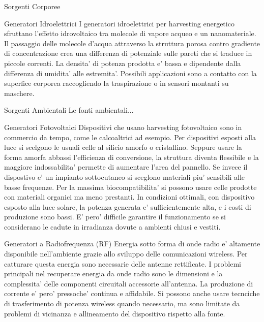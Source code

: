 \begin{section}{Sorgenti Corporee}
   \begin{subsection}{Generatori Idroelettrici}
    I generatori idroelettrici per harvesting energetico sfruttano l'effetto idrovoltaico tra molecole di vapore acqueo e un nanomateriale. Il passaggio delle molecole d'acqua attraverso la struttura porosa contro gradiente di concentrazione crea una differenza di potenziale sulle pareti che si traduce in piccole correnti. La densita' di potenza prodotta e' bassa e dipendente dalla differenza di umidita' alle estremita'. Possibili applicazioni sono a contatto con la superfice corporea raccogliendo la traspirazione o in sensori montanti su maschere. 
   \end{subsection}
\end{section}


\begin{section}{Sorgenti Ambientali}
    Le fonti ambientali...
    \begin{subsection}{Generatori Fotovoltaici}
    Dispositivi che usano harvesting fotovoltaico sono in commercio da tempo, come le calcoaltrici ad esempio. Per dispositivi esposti alla luce si scelgono le usuali celle al silicio amorfo o cristallino. Seppure usare la forma amorfa abbassi l'efficienza di conversione, la struttura diventa flessibile e la maggiore indossabilita' permette di aumentare l'area del pannello. Se invece il dispostivo e' un impianto sottocutaneo si sceglono materiali piu' sensibili alle basse frequenze. Per la massima biocompatibilita' si possono usare celle prodotte con materiali organici ma meno prestanti. In condizioni ottimali, con dispositivo esposto alla luce solare, la potenza generata e' sufficientemente alta, e i costi di produzione sono bassi. E' pero' difficile garantire il funzionamento se si considerano le cadute in irradianza dovute a ambienti chiusi e vestiti.
    \end{subsection}

    \begin{subsection}{Generatori a Radiofrequenza (RF)}
    Energia sotto forma di onde radio e' altamente disponibile nell'ambiente grazie allo sviluppo delle comunicazioni wireless. Per catturare questa energia sono necessarie delle antenne rettificate. I problemi principali nel recuperare energia da onde radio sono le dimensioni e la complessita' delle componenti circuitali accessorie all'antenna. La produzione di corrente e' pero' pressoche' continua e affidabile. Si possono anche usare tecnciche di trasferimento di potenza wireless quando necessario, ma sono limitate da problemi di vicinanza e allineamento del dispositivo rispetto alla fonte. 
    \end{subsection}
\end{section}


